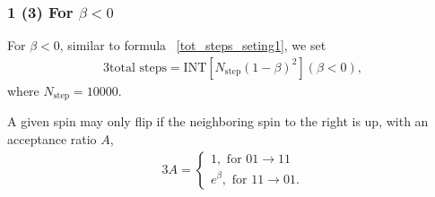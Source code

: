 \documentclass[8pt]{beamer}
\begin{document}
		
		
		
         

\begin{frame}
	\frametitle{1 (3) For $\beta < 0$ }
	For $\beta < 0$,
	similar to formula ~\ref{tot_steps_seting1}, we set 
\begin{alignat}{3}
	\text{total steps} = \text{INT}[N_\text{step} (1-\beta)^2] (\beta < 0)\label{tot_steps_setting2},
\end{alignat}
where $N_\text{step}=10000$.

	A given spin may only flip if the neighboring spin to the right is up, with an acceptance ratio $A$,
\begin{alignat}{3}
	A = \left\{
	\begin{aligned}
		1, \text{ for } 01 \to 11 \\
		e^{\beta}, \text{ for } 11 \to 01.
	\end{aligned}
	\right
	.
\end{alignat}
\end{frame}
\end{document}
